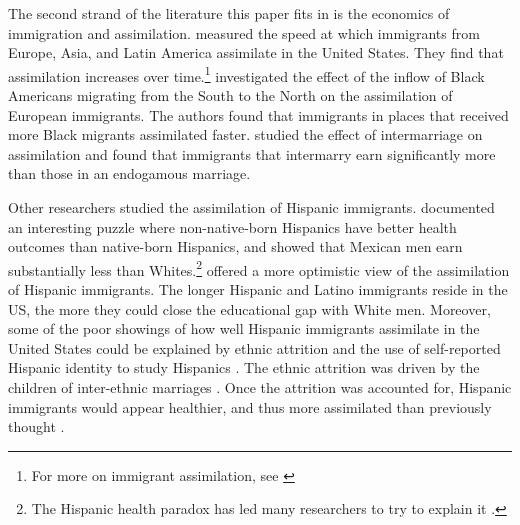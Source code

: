 \documentclass[12pt, fullpage]{article}
\begin{document}
The second strand of the literature this paper fits in is the economics of immigration and assimilation. \citet{abramitzkyCulturalAssimilationAge2016} measured the speed at which immigrants from Europe, Asia, and Latin America assimilate in the United States. They find that assimilation increases over time.\footnote{For more on immigrant assimilation, see \citet{abramitzkyLeavingEnclaveHistorical2020,abramitzkyIntergenerationalMobilityImmigrants2019,abramitzkyDiscriminationReturnsCultural2020,abramitzkyNationImmigrantsAssimilation2014}} \citet{foukaImmigrantsAmericansRace2022} investigated the effect of the inflow of Black Americans migrating from the South to the North on the assimilation of European immigrants. The authors found that immigrants in places that received more Black migrants assimilated faster.  \citet{mengIntermarriageEconomicAssimilation2005} studied the effect of intermarriage on assimilation and found that immigrants that intermarry earn significantly more than those in an endogamous marriage.

Other researchers studied the assimilation of Hispanic immigrants. \citet{antecolUnhealthyAssimilationWhy2006} documented an interesting puzzle where non-native-born Hispanics have better health outcomes than native-born Hispanics, and \citet{trejoWhyMexicanAmericans1997} showed that Mexican men earn substantially less than Whites.\footnote{The Hispanic health paradox has led many researchers to try to explain it \citep{giuntellaAssimilationHealthEvidence2016,giuntellaAccelerationImmigrantUnhealthy2017,giuntellaReasonImmigrationImmigrants2018,giuntellaWhyDoesHealth2017a,antmanEthnicAttritionObserved2016,antmanEthnicAttritionAssimilation2020}.} \citet{smithAssimilationLatinoGenerations2003} offered a more optimistic view of the assimilation of Hispanic immigrants. The longer Hispanic and Latino immigrants reside in the US, the more they could close the educational gap with White men. Moreover, some of the poor showings of how well Hispanic immigrants assimilate in the United States could be explained by ethnic attrition and the use of self-reported Hispanic identity to study Hispanics \citep{duncanComplexityImmigrantGenerations2017,duncanWhoRemainsMexican2011,mengIntermarriageEconomicAssimilation2005,duncanIdentifyingLaterGenerationDescendants2018,duncanSocioeconomicIntegrationImmigrant2018,antmanEthnicAttritionObserved2016,antmanEthnicAttritionAssimilation2020}. The ethnic attrition was driven by the children of inter-ethnic marriages \citep{mengIntermarriageEconomicAssimilation2005,duncanEthnicIdentificationIntermarriage2005}. Once the attrition was accounted for, Hispanic immigrants would appear healthier, and thus more assimilated than previously thought \citep{antmanEthnicAttritionObserved2016,antmanEthnicAttritionAssimilation2020}. 
\end{document}
